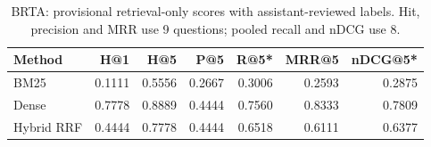 \begin{table}[htbp]\centering\small
\caption{BRTA: provisional retrieval-only scores with assistant-reviewed labels. Hit, precision and MRR use 9 questions; pooled recall and nDCG use 8.}\label{tab:retrieval-brta}
\begin{tabularx}{\linewidth}{Xrrrrrr}\toprule
Method & H@1 & H@5 & P@5 & R@5* & MRR@5 & nDCG@5*\\\midrule
BM25 & 0.1111 & 0.5556 & 0.2667 & 0.3006 & 0.2593 & 0.2875\\
Dense & 0.7778 & 0.8889 & 0.4444 & 0.7560 & 0.8333 & 0.7809\\
Hybrid RRF & 0.4444 & 0.7778 & 0.4444 & 0.6518 & 0.6111 & 0.6377\\
\bottomrule\end{tabularx}\end{table}
